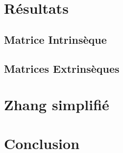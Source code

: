 \documentclass[a4paper]{article}
\begin{document}
\section{Résultats}

\subsection{Matrice Intrinsèque}

\subsection{Matrices Extrinsèques}


\clearpage

\section{Zhang simplifié}




\clearpage


\section{Conclusion}

\clearpage
\end{document}
